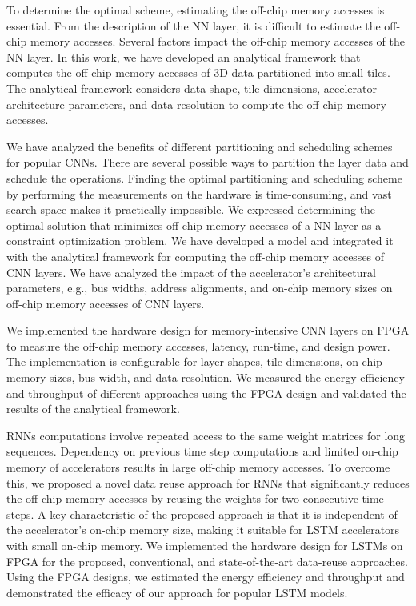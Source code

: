 To determine the optimal scheme, estimating the off-chip memory accesses is essential. From the description of the NN layer, it is difficult to estimate the off-chip memory accesses. Several factors impact the off-chip memory accesses of the NN layer. In this work, we have developed an analytical framework that computes the off-chip memory accesses of 3D data partitioned into small tiles. The analytical framework considers data shape, tile dimensions, accelerator architecture parameters, and data resolution to compute the off-chip memory accesses.

We have analyzed the benefits of different partitioning and scheduling schemes for popular CNNs. There are several possible ways to partition the layer data and schedule the operations. Finding the optimal partitioning and scheduling scheme by performing the measurements on the hardware is time-consuming, and vast search space makes it practically impossible. We expressed determining the optimal solution that minimizes off-chip memory accesses of a NN layer as a constraint optimization problem. We have developed a model and integrated it with the analytical framework for computing the off-chip memory accesses of CNN layers. We have analyzed the impact of the accelerator's architectural parameters, e.g., bus widths, address alignments, and on-chip memory sizes on off-chip memory accesses of CNN layers. 

We implemented the hardware design for memory-intensive CNN layers on FPGA to measure the off-chip memory accesses, latency, run-time, and design power. The implementation is configurable for layer shapes, tile dimensions, on-chip memory sizes, bus width, and data resolution. We measured the energy efficiency and throughput of different approaches using the FPGA design and validated the results of the analytical framework.

RNNs computations involve repeated access to the same weight matrices for long sequences. Dependency on previous time step computations and limited on-chip memory of accelerators results in large off-chip memory accesses. To overcome this, we proposed a novel data reuse approach for RNNs that significantly reduces the off-chip memory accesses by reusing the weights for two consecutive time steps. A key characteristic of the proposed approach is that it is independent of the accelerator's on-chip memory size, making it suitable for LSTM accelerators with small on-chip memory. We implemented the hardware design for LSTMs on FPGA for the proposed, conventional, and state-of-the-art data-reuse approaches. Using the FPGA designs, we estimated the energy efficiency and throughput and demonstrated the efficacy of our approach for popular LSTM models.

